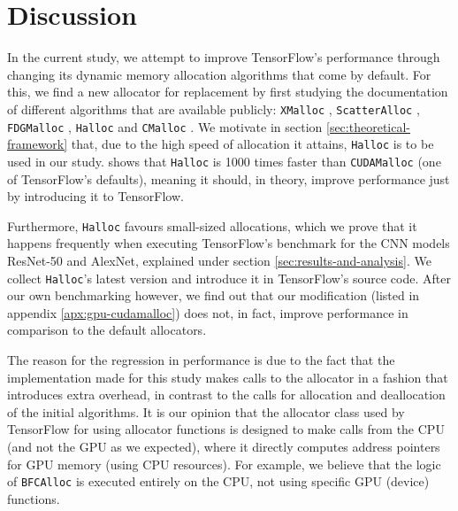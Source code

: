 \documentclass[12pt,twoside]{article}
\begin{document}
\section{Discussion}
\label{sec:discussion}

In the current study, we attempt to improve TensorFlow's performance through changing its dynamic memory allocation algorithms that come by default. For this, we find a new allocator for replacement by first studying the documentation of different algorithms that are available publicly: \texttt{XMalloc} \cite{xmalloc}, \texttt{ScatterAlloc} \cite{scatter-alloc}, \texttt{FDGMalloc} \cite{fdgmalloc}, \texttt{Halloc} \cite{halloc-paper} and \texttt{CMalloc} \cite{Vinkler2015}. We motivate in section \ref{sec:theoretical-framework} that, due to the high speed of allocation it attains, \texttt{Halloc} is to be used in our study. \cite{halloc-paper} shows that \texttt{Halloc} is 1000 times faster than \texttt{CUDAMalloc} (one of TensorFlow's defaults), meaning it should, in theory, improve performance just by introducing it to TensorFlow.

Furthermore, \texttt{Halloc} favours small-sized allocations, which we prove that it happens frequently when executing TensorFlow's benchmark for the CNN models ResNet-50 and AlexNet, explained under section \ref{sec:results-and-analysis}. We collect \texttt{Halloc}'s latest version and introduce it in TensorFlow's source code. After our own benchmarking however, we find out that our modification (listed in appendix \ref{apx:gpu-cudamalloc}) does not, in fact, improve performance in comparison to the default allocators.

The reason for the regression in performance is due to the fact that the implementation made for this study makes calls to the allocator in a fashion that introduces extra overhead, in contrast to the calls for allocation and deallocation of the initial algorithms. It is our opinion that the allocator class used by TensorFlow for using allocator functions is designed to make calls from the CPU (and not the GPU as we expected), where it directly computes address pointers for GPU memory (using CPU resources). For example, we believe that the logic of \texttt{BFCAlloc} is executed entirely on the CPU, not using specific GPU (device) functions.
\end{document}
